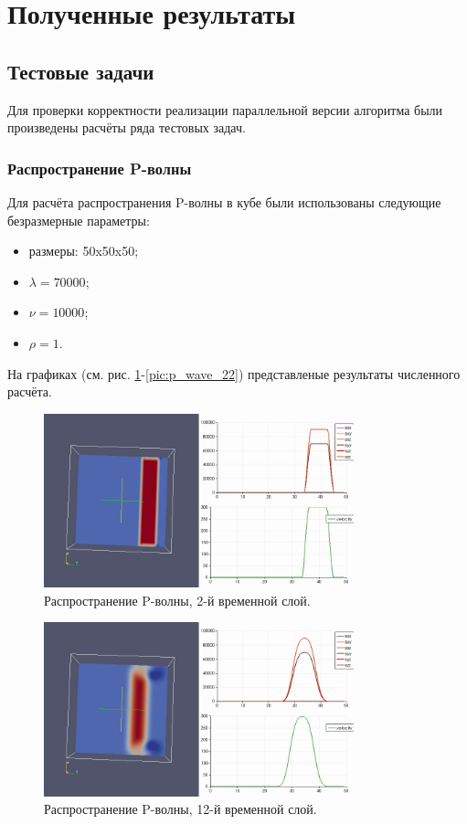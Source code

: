 \section{Полученные результаты}
\subsection{Тестовые задачи}
Для проверки корректности реализации параллельной версии алгоритма были
произведены расчёты ряда тестовых задач.
\subsubsection{Распространение P-волны}
Для расчёта распространения P-волны в кубе были использованы следующие
безразмерные параметры: 
\begin{itemize}
\item размеры: 50x50x50;
\item $\lambda=70000$;
\item $\nu=10000$;
\item $\rho=1$.
\end{itemize}
На графиках (см. рис.
\ref{pic:p_wave_2}-\ref{pic:p_wave_22}) представленые результаты численного расчёта.
\begin{figure}[htp]
\centering
\includegraphics[width=0.8\textwidth]{png/p-wave-propogation-3d-002.png}
\caption{Распространение P-волны, 2-й временной слой.}
\label{pic:p_wave_2}
\end{figure}
\begin{figure}[htp]
\centering
\includegraphics[width=0.8\textwidth]{png/p-wave-propogation-3d-012.png}
\caption{Распространение P-волны, 12-й временной слой.}
\label{pic:p_wave_12}
\end{figure}
